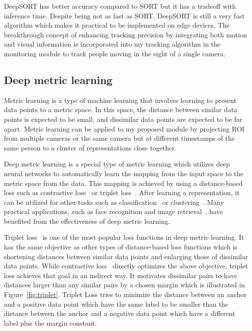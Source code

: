 \documentclass[../main.tex]{subfiles}
\begin{document}
DeepSORT has better accuracy compared to SORT but it has a tradeoff with inference time. Despite being not as fast as SORT, DeepSORT is still a very fast algorithm which makes it practical to be implemented on edge devices. The breakthrough concept of enhancing tracking precision by integrating both motion and visual information is incorporated into my tracking algorithm in the monitoring module to track people moving in the sight of a single camera.

\subsection{Deep metric learning}
\label{sec:deepmetric}
Metric learning is a type of machine learning that involves learning to present data points to a metric space. In this space, the distance between similar data points is expected to be small, and dissimilar data points are expected to be far apart. Metric learning can be applied to my proposed module by projecting ROI from multiple cameras or the same camera but at different timestamps of the same person to a cluster of representations close together.

Deep metric learning is a special type of metric learning which utilizes deep neural networks to automatically learn the mapping from the input space to the metric space from the data. This mapping is achieved by using a distance-based loss such as contrastive loss~\cite{hadsell2006dimensionality} or triplet loss~\cite{schroff2015facenet}. After learning a representation, it can be utilized for other tasks such as classification~\cite{deng2019deep} or clustering~\cite{li2020semi}. Many practical applications, such as face recognition and image retrieval~\cite{cao2020enhancing}, have benefited from the effectiveness of deep metric learning.

Triplet loss~\cite{schroff2015facenet} is one of the most popular loss functions in deep metric learning. It has the same objective as other types of distance-based loss functions which is shortening distances between similar data points and enlarging those of dissimilar data points. While contrastive loss~\cite{hadsell2006dimensionality} directly optimizes the above objective, triplet loss achieves that goal in an indirect way. It motivates dissimilar pairs to have distances larger than any similar pairs by a chosen margin which is illustrated in Figure~\ref{fig:triplet}. Triplet Loss tries to minimize the distance between an anchor and a positive data point which have the same label to be smaller than the distance between the anchor and a negative data point which have a different label plus the margin constant.
\end{document}
